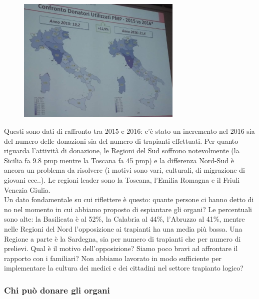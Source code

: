 \begin{figure}[!ht]
\centering
	\includegraphics[width=0.7\textwidth]{34/image7.jpeg}
	\end{figure}

Questi sono dati di raffronto tra 2015 e 2016: c'è stato un incremento
nel 2016 sia del numero delle donazioni sia del numero di trapianti
effettuati. Per quanto riguarda l'attività di donazione, le Regioni del
Sud soffrono notevolmente (la Sicilia fa 9.8 pmp mentre la Toscana fa 45
pmp) e la differenza Nord-Sud è ancora un problema da risolvere (i
motivi sono vari, culturali, di migrazione di giovani ecc..). Le regioni
leader sono la Toscana, l'Emilia Romagna e il Friuli Venezia Giulia.
\\
Un dato fondamentale su cui riflettere è questo: quante persone ci hanno
detto di no nel momento in cui abbiamo proposto di espiantare gli
organi? Le percentuali sono alte: la Basilicata è al 52\%, la Calabria
al 44\%, l'Abruzzo al 41\%, mentre nelle Regioni del Nord l'opposizione
ai trapianti ha una media più bassa. Una Regione a parte è la Sardegna,
sia per numero di trapianti che per numero di prelievi. Qual è il motivo
dell'opposizione? Siamo poco bravi ad affrontare il rapporto con i
familiari? Non abbiamo lavorato in modo sufficiente per implementare la
cultura dei medici e dei cittadini nel settore trapianto logico?

\subsubsection{Chi può donare gli organi}


